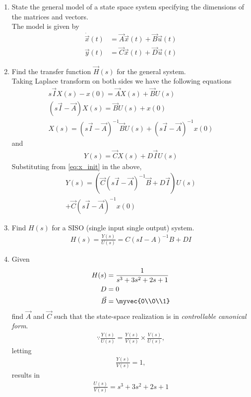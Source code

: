 \begin{enumerate}[label=\thesection.\arabic*.,ref=\thesection.\theenumi]
\item State the general model of a state space system specifying the dimensions of the matrices and vectors.
\\
\solution The model is given by 
\begin{align}
\dot{\vec{x}}(t)&=\vec{A}\vec{x}(t)+\vec{B}\vec{u}(t) \\
 \vec{y}(t)&=\vec{C}\vec{x}(t)+\vec{D} \vec{u}(t)
\end{align}
\item Find the transfer function $\vec{H}(s)$ for the general system.
\\
\solution 
Taking Laplace transform on both sides we have the following equations
\begin{align}
s\vec{I}X(s)-x(0)= \vec{A}X(s)+ \vec{B}U(s)\\
(s\vec{I}-\vec{A})X(s)= \vec{B}U(s)+ x(0)\\
X(s)={(s\vec{I}-\vec{A})^{-1}}\vec{B} U(s)+ (s\vec{I}-\vec{A})^{-1}x(0)
\label{eq:x_init}
\end{align}
and
\begin{align}
Y(s)= \vec{C}X(s)+D\vec{I}U(s)
\end{align}
Substituting from \eqref{eq:x_init} in the above,
%
\begin{multline}
Y(s)=( \vec{C}{(s\vec{I}-\vec{A})^{-1}}\vec{B}+D\vec{I}) U(s) 
\\
+ \vec{C}(s\vec{I}-\vec{A})^{-1}x(0)
\end{multline}
%
\item Find $H(s)$ for a SISO (single input single output) system.
\\
\solution
\begin{align}
H(s)= {\frac{Y(s)}{U(s)}}= C{(sI-A)^{-1}}B+DI
\end{align}

\item Given 
\begin{align}
H(s)&=\frac{1}{s^3+3s^2+2s+1}
\\
D&=0
\\
\vec{B}&= \myvec{0\\0\\1}
\end{align}
%
 find $\vec{A}$ and $\vec{C}$ such that the state-space realization is in {\em controllable canonical form}.
\\
\solution 
\begin{align} 
\because {\frac{Y(s)}{U(s)}}= \frac{Y(s)}{V(s)} \times \frac{V(s)}{U(s)},
\end{align}
letting
\begin{align}
 {\frac{Y(s)}{V(s)}}= 1, 
\end{align}
results in 
\begin{align}
{\frac{U(s)}{V(s)}}={s^3 + 3s^2+2s + 1}
\end{align}


\end{enumerate}
